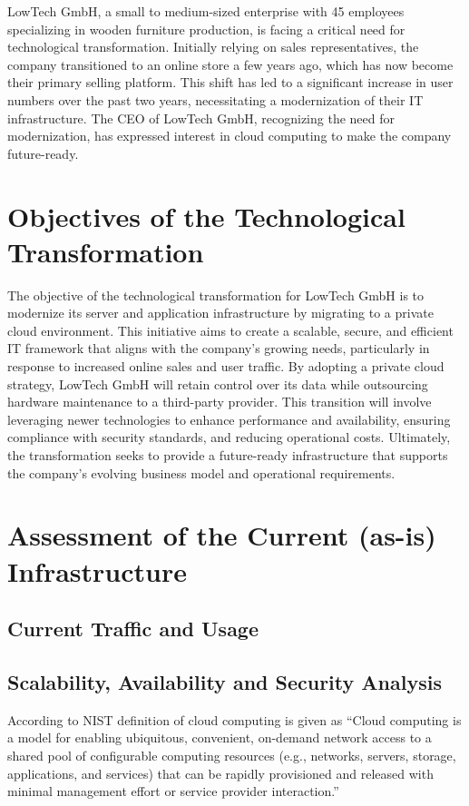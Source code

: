 \documentclass{llncs}
\begin{document}
LowTech GmbH, a small to medium-sized enterprise with 45 employees specializing in wooden furniture production, is facing a critical need for technological transformation. 
Initially relying on sales representatives, the company transitioned to an online store a few years ago, which has now become their primary selling platform. 
This shift has led to a significant increase in user numbers over the past two years, necessitating a modernization of their IT infrastructure. 
The CEO of LowTech GmbH, recognizing the need for modernization, has expressed interest in cloud computing to make the company future-ready.

\section{Objectives of the Technological Transformation}

The objective of the technological transformation for LowTech GmbH is to modernize its server and application infrastructure by migrating to a private cloud environment. 
This initiative aims to create a scalable, secure, and efficient IT framework that aligns with the company's growing needs, particularly in response to increased online sales and user traffic. 
By adopting a private cloud strategy, LowTech GmbH will retain control over its data while outsourcing hardware maintenance to a third-party provider. 
This transition will involve leveraging newer technologies to enhance performance and availability, ensuring compliance with security standards, and reducing operational costs. 
Ultimately, the transformation seeks to provide a future-ready infrastructure that supports the company's evolving business model and operational requirements.

\section{Assessment of the Current (as-is) Infrastructure}

\subsection{Current Traffic and Usage}

\subsection{Scalability, Availability and Security Analysis}
According to NIST definition of cloud computing is given as ``Cloud computing is a model for enabling ubiquitous, convenient, on-demand network access to a shared
pool of configurable computing resources (e.g., networks, servers, storage, applications, and services) that
can be rapidly provisioned and released with minimal management effort or service provider interaction.'' \cite{mell2011nist}
\end{document}
